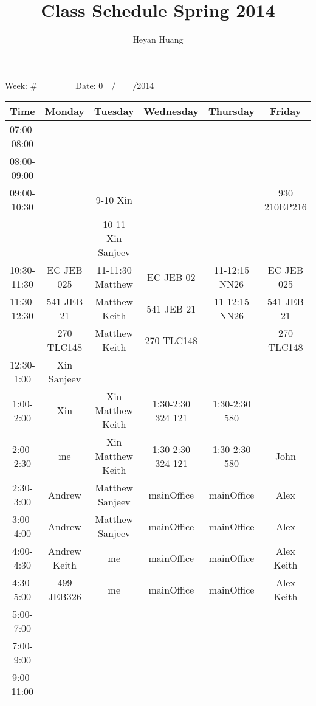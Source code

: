 \documentclass{article}  %
\title{Class Schedule Spring 2014}
\author{Heyan Huang}
\date{ }
\begin{document}

Week: \#\ \ \ \ \ \ \ \ \  Date: 0\ \ /\ \ \ \ /2014 
\begin{table}[!hbp]   %

\begin{tabular}{|c|c|c|c|c|c|}   %
\hline %
\hline %
Time        & Monday       & Tuesday           & Wednesday  & Thursday      & Friday \\
\hline
07:00-08:00 &              &                   &            &               &  \\
\hline
08:00-09:00 &              &                   &            &               &  \\
\hline
\hline
09:00-10:30 &              & 9-10 Xin          &            &               & 930 210EP216  \\
            &              & 10-11 Xin Sanjeev &            &               &  \\
\hline
10:30-11:30 & EC JEB 025   & 11-11:30 Matthew  & EC JEB 02  & 11-12:15 NN26 & EC JEB 025 \\
\hline
11:30-12:30 & 541 JEB 21   & Matthew Keith     & 541 JEB 21 & 11-12:15 NN26 & 541 JEB 21 \\
            & 270 TLC148   & Matthew Keith     & 270 TLC148 &               & 270 TLC148 \\
\hline
12:30-1:00  & Xin Sanjeev  &                   &            &               & \\
\hline
1:00-2:00   & Xin          & Xin Matthew Keith & 1:30-2:30 324 121 & 1:30-2:30 580 & \\
\hline
2:00-2:30   & me           & Xin Matthew Keith & 1:30-2:30 324 121 & 1:30-2:30 580 & John   \\
2:30-3:00   & Andrew       & Matthew Sanjeev   & mainOffice & mainOffice    & Alex   \\
\hline
3:00-4:00   & Andrew       & Matthew Sanjeev   & mainOffice & mainOffice    & Alex   \\
\hline
4:00-4:30   & Andrew Keith & me                & mainOffice & mainOffice    & Alex Keith\\
4:30-5:00   & 499 JEB326   & me                & mainOffice & mainOffice    & Alex Keith\\
\hline
\hline
5:00-7:00   &  &  &  &  & \\
\hline
\hline
7:00-9:00   &  &  &  &  & \\
\hline
9:00-11:00  &  &  &  &  & \\
\hline
\hline


\end{tabular}
\end{table}
\end{document}
